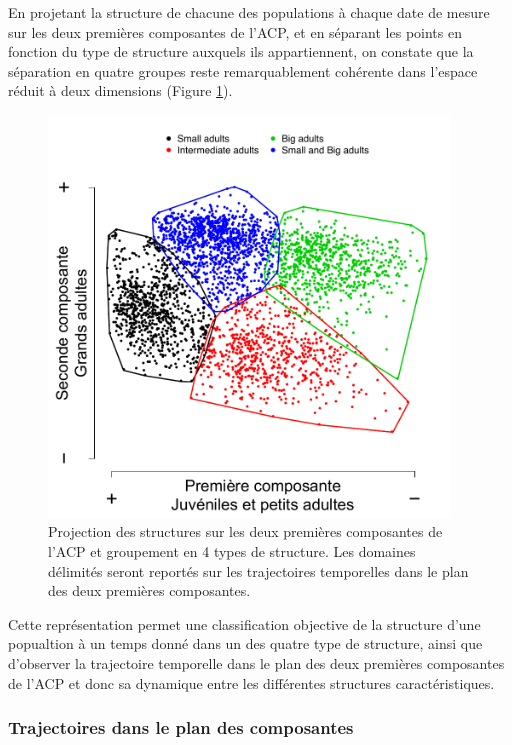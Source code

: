 En projetant la structure de chacune des populations à chaque date de mesure
sur les deux premières composantes de l'ACP, et en séparant les points en
fonction du type de structure auxquels ils appartiennent, on constate que la
séparation en quatre groupes reste remarquablement cohérente dans l'espace
réduit à deux dimensions (Figure \ref{fig:SP3}). 

\begin{figure}[!ht]
\begin{center}
\includegraphics[width=0.95\textwidth]{1_CorpsDeThese/Resumes/Fig/SP03}
\caption[Projection des données
sur les deux premières composantes]{Projection des structures sur les deux
premières composantes de l'ACP et groupement en 4 types de structure. Les
domaines délimités seront reportés sur les trajectoires temporelles dans le
plan des deux premières composantes.}
\label{fig:SP3}
\end{center}
\end{figure}

Cette représentation permet une classification objective de la structure d'une
popualtion à un temps donné dans un des quatre type de structure, ainsi que
d'observer la trajectoire temporelle dans le plan des deux premières composantes
de l'ACP et donc sa dynamique entre les différentes structures caractéristiques. 

\subsubsection{Trajectoires dans le plan des composantes}

